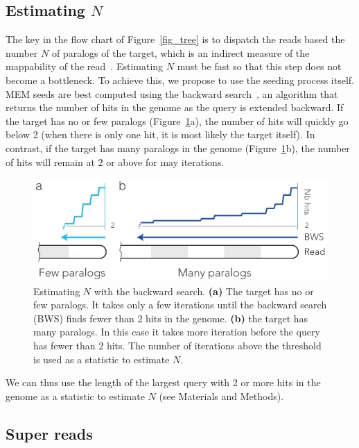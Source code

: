 \documentclass[a4,center,fleqn]{NAR}
\begin{document}
\subsection{Estimating $N$}
\label{sec_N}

The key in the flow chart of Figure~\ref{fig_tree} is to dispatch the
reads based the number $N$ of paralogs of the target, which is an
indirect measure of the mappability of the read~\cite{pmid22276185}.
Estimating $N$ must be fast so that this step does not become a
bottleneck. To achieve this, we propose to use the seeding process itself.
MEM seeds are best computed using the backward
search~\cite{ferragina2000opportunistic}, an algorithm that returns the
number of hits in the genome as the query is extended backward. If the
target has no or few paralogs (Figure~\ref{fig_back}a), the number of hits
will quickly go below 2 (when there is only one hit, it is most likely the
target itself). In contrast, if the target has many paralogs in the genome
(Figure~\ref{fig_back}b), the number of hits will remain at 2 or above for
may iterations.

\begin{figure}[t]
\begin{center}
\includegraphics[scale=.84]{pushing_backward.pdf}
\end{center}
\caption{Estimating $N$ with the backward search. \textbf{(a)} The target
has no or few paralogs. It takes only a few iterations until the backward
search (BWS) finds fewer than 2 hits in the genome. \textbf{(b)} the
target has many paralogs. In this case it takes more iteration before the
query has fewer than 2 hits. The number of iterations above the threshold
is used as a statistic to estimate $N$.}
\label{fig_back}
\end{figure}

We can thus use the length of the largest query with 2 or more hits in the
genome as a statistic to estimate $N$ (see Materials and Methods).


\subsection{Super reads}
\label{sec_super}
\end{document}

